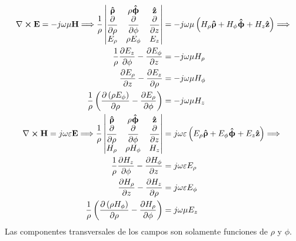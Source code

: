 \begin{subequations}
\label{grup_ec_apA:19}
\begin{align}
\nabla\boldsymbol{\times}\mathbf{E} = -j\omega\mu\mathbf{H}\Longrightarrow\frac{1}{\rho}
\begin{vmatrix}
\bm{\mathbf{\hat{\uprho}}} & \rho\bm{\mathbf{\hat{\upphi}}} & \bm{\mathbf{\hat{z}}} \\
\dfrac{\partial}{\partial\rho} &\dfrac{\partial}{\partial\phi} &\dfrac{\partial}{\partial z} \\
E_{\rho} & \rho E_{\phi} & E_z \\
\end{vmatrix}
&= -j\omega\mu\left(H_{\rho}\bm{\mathbf{\hat{\uprho}}} + H_{\phi}\bm{\mathbf{\hat{\upphi}}} + H_z\bm{\mathbf{\hat{z}}}\right)\Longrightarrow\notag\\
\frac{1}{\rho}\frac{\partial E_z}{\partial\phi} - \frac{\partial E_{\phi}}{\partial z}  &= -j\omega\mu H_{\rho}
\label{ec_apA:83}\\
\frac{\partial E_{\rho}}{\partial z} - \frac{\partial E_z}{\partial\rho} & = -j\omega\mu H_{\phi}
\label{ec_apA:84}\\
\frac{1}{\rho}\left(\frac{\partial\left(\rho E_{\phi}\right)}{\partial\rho} - \frac{\partial E_{\rho}}{\partial\phi}\right)  &= -j\omega\mu H_z
\label{ec_apA:85}\\
\nabla\boldsymbol{\times}\mathbf{H} = j\omega\varepsilon\mathbf{E}\Longrightarrow\frac{1}{\rho}
\begin{vmatrix}
\bm{\mathbf{\hat{\uprho}}} & \rho\bm{\mathbf{\hat{\upphi}}} & \bm{\mathbf{\hat{z}}} \\
\dfrac{\partial}{\partial\rho} &\dfrac{\partial}{\partial\phi} &\dfrac{\partial}{\partial z} \\
H_{\rho} & \rho H_{\phi} & H_z \\
\end{vmatrix}
&= j\omega\varepsilon\left(E_{\rho}\bm{\mathbf{\hat{\uprho}}} + E_{\phi}\bm{\mathbf{\hat{\upphi}}} + E_z\bm{\mathbf{\hat{z}}}\right)\Longrightarrow\notag\\
\frac{1}{\rho}\frac{\partial H_z}{\partial\phi} - \frac{\partial H_{\phi}}{\partial z}  &= j\omega\varepsilon E_{\rho}
\label{ec_apA:86}\\
\frac{\partial H_{\rho}}{\partial z} - \frac{\partial H_z}{\partial\rho} & = j\omega\varepsilon E_{\phi}
\label{ec_apA:87}\\
\frac{1}{\rho}\left(\frac{\partial\left(\rho H_{\phi}\right)}{\partial\rho} - \frac{\partial H_{\rho}}{\partial\phi}\right)  &= j\omega\mu E_z
\label{ec_apA:88}
\end{align}
\end{subequations}
Las componentes transversales de los campos son solamente funciones de $\rho$ y $\phi$.

